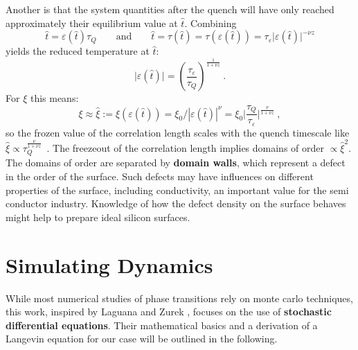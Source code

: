 	Another is that the system quantities after the quench will have only reached approximately their equilibrium value at $\hat{t}$. Combining
	\begin{equation}
		\hat{t} =	\varepsilon(\hat{t}) \tau_Q \qquad \text{and} \qquad  \hat{t} =	\tau(\hat{t}) = \tau(\varepsilon(\hat{t})) =	\tau_\varepsilon \big | \varepsilon(\hat{t}) \big |^{-\nu z}
	\end{equation} 
	yields the reduced temperature at $\hat{t}$:
	\begin{equation}
		\big|\varepsilon (\hat{t}) \big| =	\left(\frac{\tau_\varepsilon}{\tau_Q} \right)^{\frac{1}{1 + \nu z}} ~.
	\end{equation}
For $\xi$ this means:
	\begin{equation} \label{Eq::KZM-scaling}
		\xi \approx \hat{\xi} := \xi(\varepsilon(\hat{t})) =	\xi_0 / |\varepsilon(\hat{t})|^{\nu} =	\xi_0 \bigg| \frac{\tau_Q}{\tau_\varepsilon} \bigg |^{\frac{\nu}{1 + \nu z}} ~,
	\end{equation}
	so the frozen value of the correlation length scales with the quench timescale like $\hat{\xi} \propto \tau_Q^{\frac{\nu}{1 + \nu z}}$~.
	The freezeout of the correlation length implies domains of order $\propto \hat{\xi}^2$. The domains of order are separated by \textbf{domain walls}, which represent a defect in the order of the surface. Such defects may have influences on different properties of the surface, including conductivity, an important value for the semi conductor industry. Knowledge of how the defect density on the surface behaves might help to prepare ideal silicon surfaces.  
	\chapter{Simulating Dynamics}
	While most numerical studies of phase transitions rely on monte carlo techniques, this work, inspired by Laguana and Zurek \cite{laguna1997density}, focuses on the use of \textbf{stochastic differential equations}. Their mathematical basics and a derivation of a Langevin equation for our case  will be outlined in the following.

